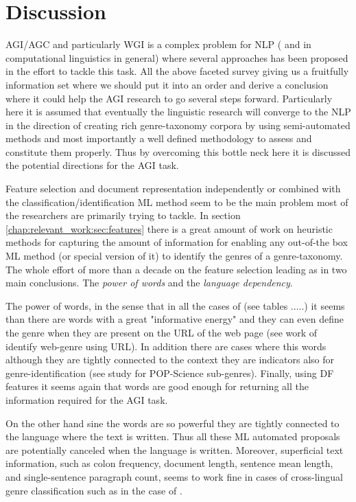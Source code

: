 {\section{Discussion}

AGI/AGC and particularly WGI is a complex problem for NLP ( and in computational linguistics in general) where several approaches has been proposed in the effort to tackle this task. All the above faceted survey giving us a fruitfully information set where we should put it into an order and derive a conclusion where it could help the AGI research to go several steps forward. Particularly here it is assumed that eventually the linguistic research will converge to the NLP in the direction of creating rich genre-taxonomy corpora by using semi-automated methods and most importantly a well defined methodology to assess and constitute them properly. Thus by overcoming this bottle neck here it is discussed the potential directions for the AGI task.

Feature selection and document representation independently or combined with the classification/identification ML method seem to be the main problem most of the researchers are primarily trying to tackle. In section \ref{chap:relevant_work:sec:features} there is a great amount of work on heuristic methods for capturing the amount of information for enabling any out-of-the box ML method (or special version of it) to identify the genres of a genre-taxonomy. The whole effort of more than a decade on the feature selection leading as in two main conclusions. The \textit{power of words} and the \textit{language dependency}.

The power of words, in the sense that in all the cases of (see tables .....) it seems than there are words with a great "informative energy" and they can even define the genre when they are present on the URL of the web page (see work of identify web-genre using URL). In addition there are cases where this words although they are tightly connected to the context they are indicators also for genre-identification (see study for POP-Science sub-genres). Finally, using DF features it seems again that words are good enough for returning all the information required for the AGI task. 

On the other hand sine the words are so powerful they are tightly connected to the language where the text is written. Thus all these ML automated proposals are potentially canceled when the language is written. Moreover, superficial text information, such as colon frequency, document length, sentence mean length, and single-sentence paragraph count, seems to work fine in cases of cross-lingual genre classification such as in the case of \parencite{nguyen2019cross}. 

}
